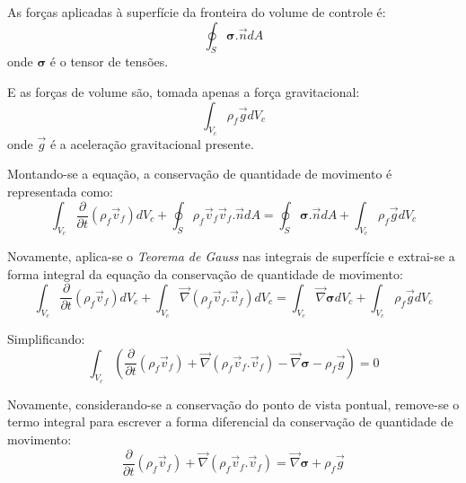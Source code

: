 As forças aplicadas à superfície da fronteira do volume de controle é:
\begin{equation}
    \oint_{S}\boldsymbol{\sigma}.\vec{n} dA
    \label{result_sup_qmov}
\end{equation}
onde $\boldsymbol{\sigma}$ é o tensor de tensões.

E as forças de volume são, tomada apenas a força gravitacional:
\begin{equation}
    \int_{V_c}\rho_f \vec{g} dV_c
    \label{result_vol_qmov}
\end{equation}
onde $\vec{g}$ é a aceleração gravitacional presente.

Montando-se a equação, a conservação de quantidade de movimento é representada como:
\begin{equation}
    \int_{V_c}\dfrac{\partial}{\partial t} (\rho_f \vec{v}_f) d V_c + 
    \oint_{S}\rho_f \vec{v}_f \vec{v}_f.\vec{n} dA =
    \oint_{S}\boldsymbol{\sigma}.\vec{n} dA +
    \int_{V_c}\rho_f \vec{g} dV_c
    \label{cons_qmov}
\end{equation}

Novamente, aplica-se o \textit{Teorema de Gauss} nas integrais de superfície e extrai-se a forma integral da equação da conservação de quantidade de movimento:
\begin{equation}
    \int_{V_c}\dfrac{\partial}{\partial t} (\rho_f \vec{v}_f) d V_c + 
    \int_{V_c}\vec{\nabla}(\rho_f \vec{v}_f.\vec{v}_f) dV_c =
    \int_{V_c}\vec{\nabla}\boldsymbol{\sigma} dV_c +
    \int_{V_c}\rho_f \vec{g} dV_c
\end{equation}

Simplificando:
\begin{equation}
    \int_{V_c} \left(
	    \dfrac{\partial}{\partial t} (\rho_f \vec{v}_f) + 
	    \vec{\nabla}(\rho_f \vec{v}_f.\vec{v}_f) -
	    \vec{\nabla}\boldsymbol{\sigma} -
	    \rho_f \vec{g}
    \right) = 0
    \label{cons_qmov_int}
\end{equation}

Novamente, considerando-se a conservação do ponto de vista pontual, remove-se o termo integral para escrever a forma diferencial da conservação de quantidade de movimento:
\begin{equation}
    \dfrac{\partial}{\partial t} (\rho_f \vec{v}_f) + 
    \vec{\nabla}(\rho_f \vec{v}_f.\vec{v}_f) =
    \vec{\nabla}\boldsymbol{\sigma} +
    \rho_f \vec{g}
    \label{cons_qmov_dif}
\end{equation}

